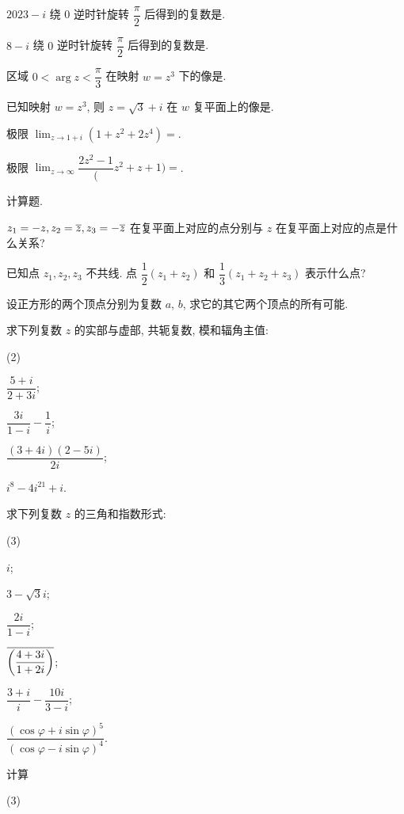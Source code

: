 \begin{homework}
\begin{exlist}
    \item $2023-i$ 绕 $0$ 逆时针旋转 $\dfrac\pi2$ 后得到的复数是\fillblank{}.
    \item $8-i$ 绕 $0$ 逆时针旋转 $\dfrac\pi2$ 后得到的复数是\fillblank{}.
    \item 区域 $0<\arg z<\dfrac\pi3$ 在映射 $w=z^3$ 下的像是\fillblank[12em]{}.
    \item 已知映射 $w=z^3$, 则 $z=\sqrt3+i$ 在 $w$ 复平面上的像是\fillblank{}.
    \item 极限 $\displaystyle\lim_{z\to1+i}(1+z^2+2z^4)=$\fillblank{}.
    \item 极限 $\displaystyle\lim_{z\to\infty}\dfrac{2z^2-1}(z^2+z+1)=$\fillblank{}.
  \end{exlist}
  \item 计算题.
  \begin{exlist}
    \item $z_1=-z,z_2=\overline z,z_3=-\overline{z}$ 在复平面上对应的点分别与 $z$ 在复平面上对应的点是什么关系?
    \item 已知点 $z_1,z_2,z_3$ 不共线. 点 $\dfrac12(z_1+z_2)$ 和 $\dfrac13(z_1+z_2+z_3)$ 表示什么点?
    \item 设正方形的两个顶点分别为复数 $a$, $b$, 求它的其它两个顶点的所有可能.
    \item 求下列复数 $z$ 的实部与虚部, 共轭复数, 模和辐角主值:
    \begin{tasksexer}(2)
      \item $\dfrac{5+i}{2+3i}$;
      \item $\dfrac{3i}{1-i}-\dfrac1i$;
      \item $\dfrac{(3+4i)(2-5i)}{2i}$;
      \item $i^8-4i^{21}+i$.
    \end{tasksexer}
    \item 求下列复数 $z$ 的三角和指数形式:
    \begin{tasksexer}(3)
      \item $i$;
      \item $3-\sqrt 3i$;
      \item $\dfrac{2i}{1-i}$;
      \item $\overline{\biggl(\dfrac{4+3i}{1+2i}\biggr)}$;
      \item $\dfrac{3+i}{i}-\dfrac{10i}{3-i}$;
      \item $\dfrac{(\cos \varphi+i\sin \varphi)^5}{(\cos \varphi-i\sin \varphi)^4}$.
    \end{tasksexer}
    \item 计算
    \begin{tasksexer}(3)

\end{tasksexer}
\end{exlist}
\end{homework}
